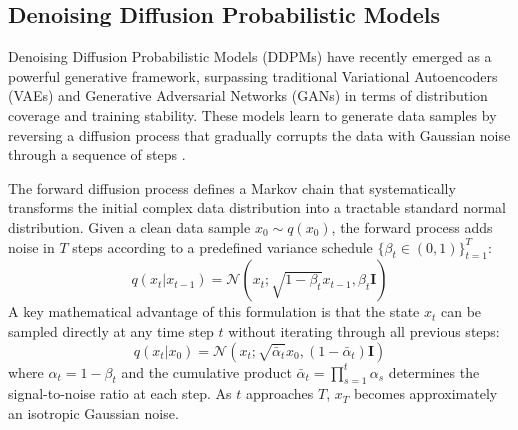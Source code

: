 \subsection{Denoising Diffusion Probabilistic Models}
\label{subsec:ddpm}

Denoising Diffusion Probabilistic Models (DDPMs) have recently emerged as a powerful generative framework, surpassing traditional Variational Autoencoders (VAEs) and Generative Adversarial Networks (GANs) in terms of distribution coverage and training stability. These models learn to generate data samples by reversing a diffusion process that gradually corrupts the data with Gaussian noise through a sequence of steps \cite{ho2020denoising}.

The forward diffusion process defines a Markov chain that systematically transforms the initial complex data distribution into a tractable standard normal distribution. Given a clean data sample $x_0 \sim q(x_0)$, the forward process adds noise in $T$ steps according to a predefined variance schedule $\{\beta_t \in (0,1)\}_{t=1}^T$:
\begin{equation}
q(x_t|x_{t-1}) = \mathcal{N}(x_t; \sqrt{1-\beta_t}x_{t-1}, \beta_t \mathbf{I})
\end{equation}
A key mathematical advantage of this formulation is that the state $x_t$ can be sampled directly at any time step $t$ without iterating through all previous steps:
\begin{equation}
q(x_t|x_0) = \mathcal{N}(x_t; \sqrt{\bar{\alpha}_t}x_0, (1-\bar{\alpha}_t)\mathbf{I})
\end{equation}
where $\alpha_t = 1 - \beta_t$ and the cumulative product $\bar{\alpha}_t = \prod_{s=1}^t \alpha_s$ determines the signal-to-noise ratio at each step. As $t$ approaches $T$, $x_T$ becomes approximately an isotropic Gaussian noise.

